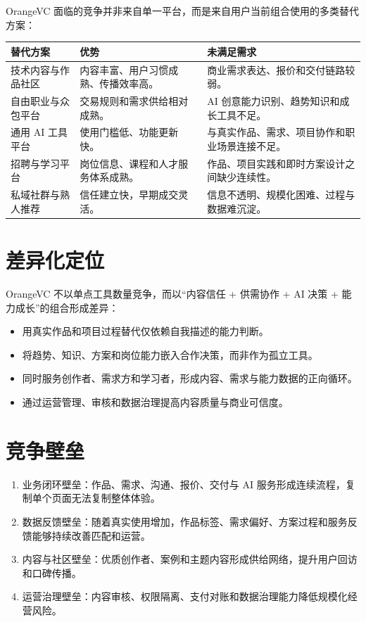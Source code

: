 \documentclass[12pt,a4paper,openany,fontset=fandol]{ctexrep}
\begin{document}
OrangeVC 面临的竞争并非来自单一平台，而是来自用户当前组合使用的多类替代方案：

\begin{longtable}{p{3.4cm} p{5.1cm} p{5.2cm}}
\toprule
替代方案 & 优势 & 未满足需求 \\
\midrule
技术内容与作品社区 & 内容丰富、用户习惯成熟、传播效率高。 & 商业需求表达、报价和交付链路较弱。 \\
自由职业与众包平台 & 交易规则和需求供给相对成熟。 & AI 创意能力识别、趋势知识和成长工具不足。 \\
通用 AI 工具平台 & 使用门槛低、功能更新快。 & 与真实作品、需求、项目协作和职业场景连接不足。 \\
招聘与学习平台 & 岗位信息、课程和人才服务体系成熟。 & 作品、项目实践和即时方案设计之间缺少连续性。 \\
私域社群与熟人推荐 & 信任建立快，早期成交灵活。 & 信息不透明、规模化困难、过程与数据难沉淀。 \\
\bottomrule
\end{longtable}

\section{差异化定位}

OrangeVC 不以单点工具数量竞争，而以“内容信任 + 供需协作 + AI 决策 + 能力成长”的组合形成差异：

\begin{itemize}
  \item 用真实作品和项目过程替代仅依赖自我描述的能力判断。
  \item 将趋势、知识、方案和岗位能力嵌入合作决策，而非作为孤立工具。
  \item 同时服务创作者、需求方和学习者，形成内容、需求与能力数据的正向循环。
  \item 通过运营管理、审核和数据治理提高内容质量与商业可信度。
\end{itemize}

\section{竞争壁垒}

\begin{enumerate}
  \item 业务闭环壁垒：作品、需求、沟通、报价、交付与 AI 服务形成连续流程，复制单个页面无法复制整体体验。
  \item 数据反馈壁垒：随着真实使用增加，作品标签、需求偏好、方案过程和服务反馈能够持续改善匹配和运营。
  \item 内容与社区壁垒：优质创作者、案例和主题内容形成供给网络，提升用户回访和口碑传播。
  \item 运营治理壁垒：内容审核、权限隔离、支付对账和数据治理能力降低规模化经营风险。
\end{enumerate}
\end{document}
